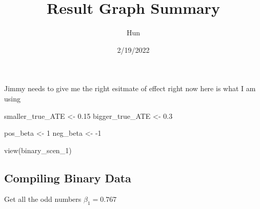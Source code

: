 \documentclass[
]{article}
\title{Result Graph Summary}
\author{Hun}
\date{2/19/2022}
\newenvironment{Shaded}{\begin{snugshade}}{\end{snugshade}}
\newcommand{\DecValTok}[1]{\textcolor[rgb]{0.00,0.00,0.81}{#1}}
\newcommand{\FloatTok}[1]{\textcolor[rgb]{0.00,0.00,0.81}{#1}}
\newcommand{\FunctionTok}[1]{\textcolor[rgb]{0.00,0.00,0.00}{#1}}
\newcommand{\NormalTok}[1]{#1}
\newcommand{\OtherTok}[1]{\textcolor[rgb]{0.56,0.35,0.01}{#1}}
\newcommand{\SpecialCharTok}[1]{\textcolor[rgb]{0.00,0.00,0.00}{#1}}
\begin{document}
\maketitle

Jimmy needs to give me the right esitmate of effect right now here is
what I am using

\begin{Shaded}
\begin{Highlighting}[]
\NormalTok{smaller\_true\_ATE }\OtherTok{\textless{}{-}} \FloatTok{0.15}
\NormalTok{bigger\_true\_ATE }\OtherTok{\textless{}{-}} \FloatTok{0.3}

\NormalTok{pos\_beta }\OtherTok{\textless{}{-}} \DecValTok{1}
\NormalTok{neg\_beta }\OtherTok{\textless{}{-}} \SpecialCharTok{{-}}\DecValTok{1}
\end{Highlighting}
\end{Shaded}

\begin{Shaded}
\begin{Highlighting}[]
\FunctionTok{view}\NormalTok{(binary\_scen\_1)}
\end{Highlighting}
\end{Shaded}

\hypertarget{compiling-binary-data}{%
\subsection{Compiling Binary Data}\label{compiling-binary-data}}

Get all the odd numbers \(\beta_1 = 0.767\)
\end{document}
